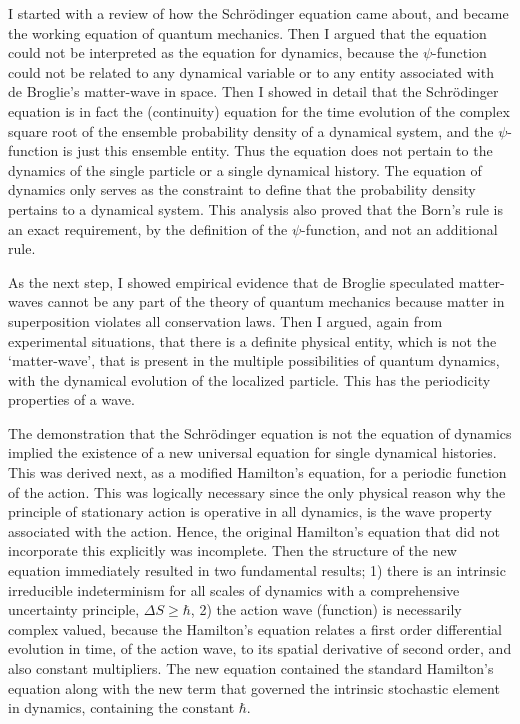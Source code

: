 I started with a review of how the Schr\"{o}dinger equation came about, and became the
working equation of quantum mechanics. Then I argued that the equation could not be
interpreted as the equation for dynamics, because the $\psi$-function could not be related to
any dynamical variable or to any entity associated with de Broglie's matter-wave in space.
Then I showed in detail that the Schr\"{o}dinger equation is in fact the (continuity) equation
for the time evolution of the complex square root of the ensemble probability density of a
dynamical system, and the $\psi$-function is just this ensemble entity. Thus the equation does
not pertain to the dynamics of the single particle or a single dynamical history. The equation
of dynamics only serves as the constraint to define that the probability density pertains to
a dynamical system. This analysis also proved that the Born's rule is an exact requirement,
by the definition of the $\psi$-function, and not an additional rule.

As the next step, I showed empirical evidence that de Broglie speculated matter-waves
cannot be any part of the theory of quantum mechanics because matter in superposition
violates all conservation laws. Then I argued, again from experimental situations, that there
is a definite physical entity, which is not the `matter-wave', that is present in the multiple
possibilities of quantum dynamics, with the dynamical evolution of the localized particle. This has the periodicity properties of a wave.

The demonstration that the Schrödinger equation is not the equation of dynamics implied
the existence of a new universal equation for single dynamical histories. This was derived
next, as a modified Hamilton's equation, for a periodic function of the action. This was
logically necessary since the only physical reason why the principle of stationary action
is operative in all dynamics, is the wave property associated with the action. Hence, the
original Hamilton's equation that did not incorporate this explicitly was incomplete. Then
the structure of the new equation immediately resulted in two fundamental results; 1) there
is an intrinsic irreducible indeterminism for all scales of dynamics with a comprehensive
uncertainty principle, $\Delta S \geq  \hbar$, 2) the action wave (function) is necessarily complex valued,
because the Hamilton's equation relates a first order differential evolution in time, of the
action wave, to its spatial derivative of second order, and also constant multipliers. The
new equation contained the standard Hamilton's equation along with the new term that
governed the intrinsic stochastic element in dynamics, containing the constant $\hbar$.

